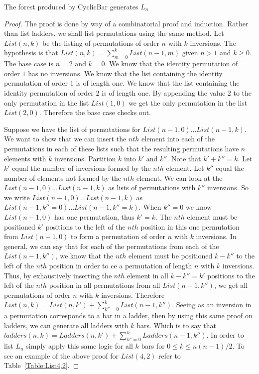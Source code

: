 \begin{theorem}
  The forest produced by {\sc CyclicBar} generates $L_{n}$
\end{theorem}


\begin{proof}
  The proof is done by way of a combinatorial proof and induction. Rather than list ladders, we shall list permutations using the same method.  
  Let $List(n, k)$ be the listing of permutations of order $n$ with $k$ inversions. The hypothesis is that $List(n, k)=\sum_{m=0}^{k} List(n-1, m)$ 
  given $n>1$ and $k \geq 0$.
  The base case is $n=2$ and $k=0$. We know that the identity permutation of order $1$ has no inversions. We know that the list containing the identity 
  permutation of order $1$ is of length one. We know that the list containing the identity permutation of order $2$ is of length one. By appending the 
  value $2$ to the only permutation in the list $List(1, 0)$ we get the only permutation in the list $List(2, 0)$. Therefore the base case checks out.
  
  Suppose we have the list of permutations for $List(n-1, 0) \dots List(n-1, k)$. We want to show that we can insert the $nth$ element into each of the
  permutations in each of these lists such that the resulting permutations have $n$ elements with $k$ inversions. Partition $k$ into $k'$ and $k''$. Note that 
  $k'+k''=k$.
  Let $k'$ equal the number of inversions formed by the $nth$ element. Let $k''$ equal the number of elements not formed by the $nth$ element.
  We can look at the $List(n-1, 0) \dots List(n-1, k)$ as lists of permutations with $k''$ inversions. So we write 
  $List(n-1, 0) \dots List(n-1, k)$ as $List(n-1, k''=0) \dots List(n-1, k''=k)$. When $k''=0$ we know $List(n-1, 0)$ has one permutation, thus $k'=k$.
  The $nth$ element must be positioned $k'$ positions to the left of the $nth$ position in this one permutation from $List(n-1, 0)$ to form a permutation of order $n$ with $k$ inversions. 
  In general, we can say that for each of the permutations from each of the $List(n-1, k'')$, we know that the $nth$ element must be positioned $k-k''$ to the left of the $nth$ position in order to 
  ce a permutation of length $n$ with $k$ inversions. Thus, by exhaustively inserting the $nth$ element in all $k-k''=k'$ positions to the left of the $nth$ position 
  in all permutations from all $List(n-1, k'')$, we get all permutations of order $n$ with $k$ inversions. 
  Therefore $List(n, k) = List(n, k') + \sum_{k''=0}^{k} List(n-1, k'') $.
  Seeing as an inversion in a permutation corresponds to a bar in 
  a ladder, then by using this same proof on ladders, we can generate all ladders with $k$ bars. 
  Which is to say that $ladders(n, k) = Ladders(n, k') + \sum_{k''=0}^{k} Ladders(n-1, k'')$.
  In order to list $L_{n}$ simply apply this same logic for all $k$ bars for $0 \leq k \leq n(n-1)/2$. To see an example of the above proof for $List(4, 2)$ refer to Table~\ref{Table:List4,2}.

\end{proof}

